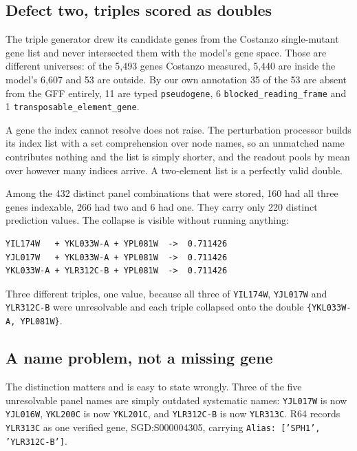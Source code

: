 \subsection{Defect two, triples scored as doubles}
\label{sec:doubles}

The triple generator drew its candidate genes from the Costanzo single-mutant
gene list and never intersected them with the model's gene space. Those are
different universes: of the 5{,}493 genes Costanzo measured, 5{,}440 are inside
the model's 6{,}607 and 53 are outside. By our own annotation 35 of the 53 are
absent from the GFF entirely, 11 are typed \texttt{pseudogene}, 6
\texttt{blocked\_reading\_frame} and 1 \texttt{transposable\_element\_gene}.

A gene the index cannot resolve does not raise. The perturbation processor builds
its index list with a set comprehension over node names, so an unmatched name
contributes nothing and the list is simply shorter, and the readout pools by mean
over however many indices arrive. A two-element list is a perfectly valid double.

Among the 432 distinct panel combinations that were stored, 160 had all three
genes indexable, 266 had two and 6 had one. They carry only 220 distinct
prediction values. The collapse is visible without running anything:

\begin{verbatim}
YIL174W   + YKL033W-A + YPL081W  ->  0.711426
YJL017W   + YKL033W-A + YPL081W  ->  0.711426
YKL033W-A + YLR312C-B + YPL081W  ->  0.711426
\end{verbatim}

Three different triples, one value, because all three of \texttt{YIL174W},
\texttt{YJL017W} and \texttt{YLR312C-B} were unresolvable and each triple
collapsed onto the double \texttt{\{YKL033W-A, YPL081W\}}.

\subsection{A name problem, not a missing gene}
\label{sec:alias}

The distinction matters and is easy to state wrongly. Three of the five
unresolvable panel names are simply outdated systematic names:
\texttt{YJL017W} is now \texttt{YJL016W}, \texttt{YKL200C} is now
\texttt{YKL201C}, and \texttt{YLR312C-B} is now \texttt{YLR313C}. R64 records
\texttt{YLR313C} as one verified gene, SGD:S000004305, carrying
\texttt{Alias: ['SPH1', 'YLR312C-B']}.

